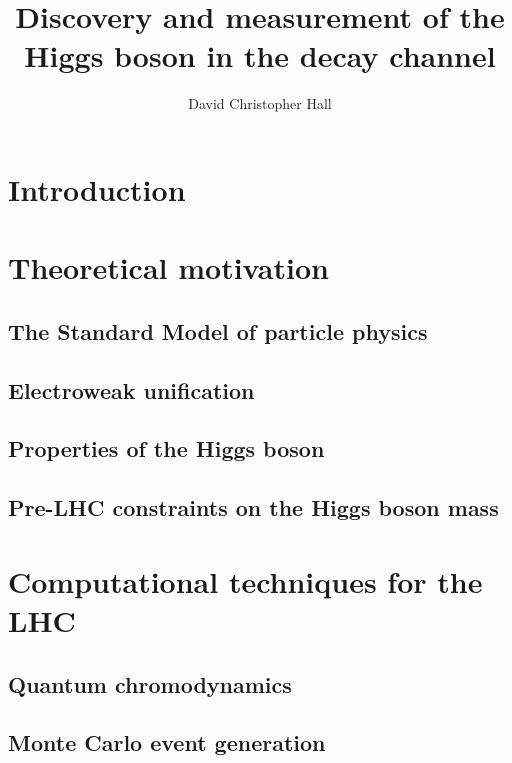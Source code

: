\documentclass[hyper,linkcolor=blue]{mythesis}
\title{Discovery and measurement of the Higgs boson in the \WW decay channel}
\author{David Christopher Hall}
\begin{document}
\begin{frontmatter}
  
\end{frontmatter}

\begin{mainmatter}
  \clearpage
  
  \chapter*{Introduction}
    \label{chap:intro}
    

  \chapter{Theoretical motivation}
    \label{chap:motivation}
    
    \section{The Standard Model of particle physics}
      \label{sec:sm}
      
    \section{Electroweak unification}
      \label{sec:ewsb}
      
    \section{Properties of the Higgs boson}
      \label{sec:properties}
      
    \section{Pre-LHC constraints on the Higgs boson mass}
      \label{sec:prior_constraints}
      

  \chapter{Computational techniques for the LHC}
    \label{chap:tools}
    
    \section{Quantum chromodynamics}
      \label{sec:qcd}
      
    \section{Monte Carlo event generation}
      \label{sec:mc}
      

\end{mainmatter}
\end{document}
